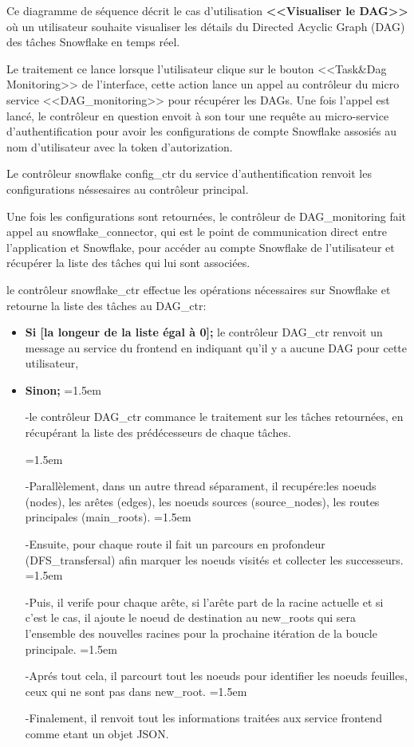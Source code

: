     \par Ce diagramme de séquence décrit le cas d'utilisation \textbf{<<Visualiser le DAG>>} où 
    un utilisateur souhaite visualiser les détails du Directed Acyclic Graph (DAG) des tâches Snowflake en temps réel.
    \par Le traitement ce lance lorsque l'utilisateur clique sur le bouton <<Task\&Dag Monitoring>> de l'interface, 
    cette action lance un appel au contrôleur du micro service <<DAG\_monitoring>> pour récupérer les DAGs.
    Une fois l'appel est lancé, le contrôleur en question envoit à son tour une requête au micro-service d'authentification pour avoir les configurations de compte Snowflake assosiés au nom d'utilisateur avec la token d'autorization.
    \par Le contrôleur snowflake config\_ctr du service d'authentification renvoit les configurations néssesaires au contrôleur principal.
    \par Une fois les configurations sont retournées, le contrôleur de DAG\_monitoring fait appel au snowflake\_connector, qui est le point de communication direct entre l'application et Snowflake, pour accéder au compte Snowflake de l'utilisateur et récupérer la liste des tâches qui lui sont associées.
    \par le contrôleur snowflake\_ctr effectue les opérations nécessaires sur Snowflake et retourne la liste des tâches au DAG\_ctr:
    \begin{itemize}
        \item \textbf{Si [la longeur de la liste égal à 0];} le contrôleur DAG\_ctr renvoit un message au service du frontend en indiquant qu'il y a aucune DAG pour cette utilisateur,
        \item \textbf{Sinon;} \parindent=1.5em \par -le contrôleur DAG\_ctr commance le traitement sur les tâches retournées, en récupérant la liste des prédécesseurs de chaque tâches.
       
        \parindent=1.5em \par -Parallèlement, dans un autre thread séparament, il recupére:les noeuds (nodes), les arêtes (edges), les noeuds sources (source\_nodes), les routes principales (main\_roots). 
        \parindent=1.5em \par -Ensuite, pour chaque route il fait un parcours en profondeur (DFS\_transfersal) afin marquer les noeuds visités et collecter les successeurs. 
        \parindent=1.5em \par -Puis, il verife pour chaque arête, si l'arête part de la racine actuelle et si c'est le cas, il ajoute le noeud de destination au new\_roots qui sera l'ensemble des nouvelles racines pour la prochaine itération de la boucle principale.
        \parindent=1.5em \par -Aprés tout cela, il parcourt tout les noeuds pour identifier les noeuds feuilles, ceux qui ne sont pas dans new\_root.
        \parindent=1.5em \par -Finalement, il renvoit tout les informations traitées aux service frontend comme etant un objet JSON.
                
    \end{itemize}
